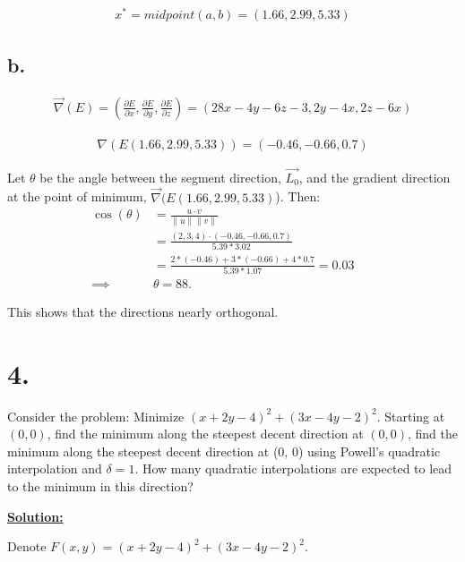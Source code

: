 \documentclass{article}
\begin{document}
\begin{align*}
  x^* = midpoint(a,b) = (1.66, 2.99, 5.33)
\end{align*}

\subsection*{b.}
\begin{align*}
  \vec{\nabla}(E) 
  = 
    \left(
      \frac{\partial E}{\partial x},
      \frac{\partial E}{\partial y},
      \frac{\partial E}{\partial z}
    \right)
  = \left(
      28x -4y -6z -3,
      2y -4x,
      2z -6x
    \right)
\end{align*}
  
\begin{align*}
  \nabla(E(1.66,2.99,5.33))
  = \left(
      -0.46,
      -0.66,
      0.7
    \right)
\end{align*}

Let $\theta$ be the angle between the segment direction, $\vec{L_0}$, and the gradient direction at the point of minimum, $\vec{\nabla}(E(1.66,2.99,5.33)$). Then:
\begin{align*}
  \cos(\theta) 
  &= \frac{u \cdot v}{\lVert u \rVert \lVert v \rVert} &&\\
  &= \frac{\left(2,3,4\right) \cdot \left(-0.46,-0.66,0.7 \right)}{5.39 * 3.02} &&\\
  &= \frac{2 * (-0.46) + 3*(-0.66) + 4*0.7}{5.39 * 1.07} = 0.03 &&\\
  \implies& \theta = 88.
\end{align*}

This shows that the directions nearly orthogonal.
\newpage

\section*{4.}
Consider the problem: Minimize $(x+2y-4)^2 + (3x -4y-2)^2$. Starting at $(0,0)$, find the minimum along the steepest decent direction at $(0, 0)$, find the minimum along the steepest decent direction at (0, 0) using Powell's quadratic interpolation and $\delta = 1$. How many quadratic interpolations are expected to lead to the minimum in this direction?

\begin{center}
  \textbf{\underline{Solution:}}  
\end{center}

Denote $F(x,y) = (x+2y-4)^2 + (3x -4y-2)^2$.
\end{document}
